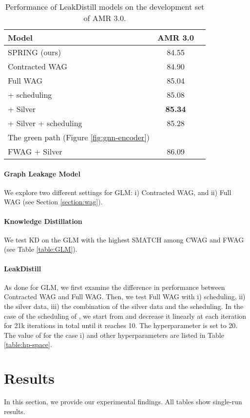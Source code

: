 \documentclass[11pt]{article}
\begin{document}
\begin{table}[t]
\centering
\begin{tabular}{lcc}
\toprule
\textbf{Model} & \textbf{AMR 3.0} \\
\midrule
SPRING (ours) & 84.55 \\
\midrule
Contracted WAG & 84.90  \\
Full WAG & 85.04  \\
\quad +  scheduling &  85.08 \\
\quad+ Silver  & \textbf{85.34} \\
\quad+ Silver +  scheduling & 85.28 \\
\midrule
The green path (Figure \ref{fig:gnn-encoder}) \\ FWAG + Silver  & 86.09 \\
\bottomrule
\end{tabular}
\caption{Performance of LeakDistill models on the development set of AMR 3.0. }
\label{table:paerfomance-2-path-model}
\end{table}



\paragraph{Graph Leakage Model}
We explore two different settings for GLM: i) Contracted WAG, and ii) Full WAG (see Section \ref{section:wag}).


\paragraph{Knowledge Distillation} 
We test KD on the GLM with the highest SMATCH among CWAG and FWAG (see Table \ref{table:GLM}).

\paragraph{LeakDistill}
As done for GLM, we first examine the difference in performance between Contracted WAG and Full WAG. Then, we test Full WAG with i)  scheduling, ii) the silver data, iii) the combination of the silver data and the  scheduling. In the case of the scheduling of , we start from  and decrease it linearly at each iteration for 21k iterations in total until it reaches 10. The hyperparameter  is set to 20. The value of  for the case i) and other hyperparameters are listed in Table \ref{table:hp-space}.



\section{Results}\label{section:results}
In this section, we provide our experimental findings. All tables show single-run results.
\end{document}

